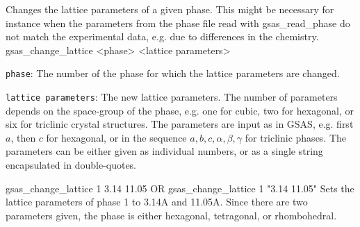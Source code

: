 {
Changes the lattice parameters of a given phase. This might be necessary for instance when the parameters from the phase file read with gsas\_read\_phase do not match the experimental data, e.g. due to differences in the chemistry.
}{
gsas\_change\_lattice <phase> <lattice parameters>
}{
\item \texttt{phase}: The number of the phase for which the lattice parameters are changed.
\item \texttt{lattice parameters}: The new lattice parameters. The number of parameters depends on the space-group of the phase, e.g. one for cubic, two for hexagonal, or six for triclinic crystal structures. The parameters are input as in GSAS, e.g. first $a$, then $c$ for hexagonal, or in the sequence $a, b, c, \alpha, \beta, \gamma$ for triclinic phases. The parameters can be either given as individual numbers, or as a single string encapsulated in double-quotes.
}{
gsas\_change\_lattice 1 3.14 11.05 OR
gsas\_change\_lattice 1 "3.14 11.05"
}{
Sets the lattice parameters of phase 1 to 3.14A and 11.05A. Since there are two parameters given, the phase is either hexagonal, tetragonal, or rhombohedral.
}


